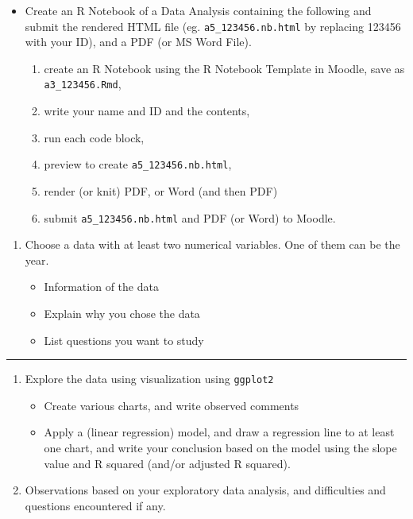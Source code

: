 \documentclass[
]{article}
\providecommand{\tightlist}{%
  \setlength{\itemsep}{0pt}\setlength{\parskip}{0pt}}
\begin{document}
\begin{itemize}
\tightlist
\item
  Create an R Notebook of a Data Analysis containing the following and
  submit the rendered HTML file (eg. \texttt{a5\_123456.nb.html} by
  replacing 123456 with your ID), and a PDF (or MS Word File).

  \begin{enumerate}
  \def\labelenumi{\arabic{enumi}.}
  \tightlist
  \item
    create an R Notebook using the R Notebook Template in Moodle, save
    as \texttt{a3\_123456.Rmd},
  \item
    write your name and ID and the contents,
  \item
    run each code block,
  \item
    preview to create \texttt{a5\_123456.nb.html},
  \item
    render (or knit) PDF, or Word (and then PDF)
  \item
    submit \texttt{a5\_123456.nb.html} and PDF (or Word) to Moodle.
  \end{enumerate}
\end{itemize}

\begin{enumerate}
\def\labelenumi{\arabic{enumi}.}
\item
  Choose a data with at least two numerical variables. One of them can
  be the year.

  \begin{itemize}
  \tightlist
  \item
    Information of the data
  \item
    Explain why you chose the data
  \item
    List questions you want to study
  \end{itemize}
\end{enumerate}

\begin{center}\rule{0.5\linewidth}{0.5pt}\end{center}

\begin{enumerate}
\def\labelenumi{\arabic{enumi}.}
\setcounter{enumi}{1}
\item
  Explore the data using visualization using \texttt{ggplot2}

  \begin{itemize}
  \tightlist
  \item
    Create various charts, and write observed comments
  \item
    Apply a (linear regression) model, and draw a regression line to at
    least one chart, and write your conclusion based on the model using
    the slope value and R squared (and/or adjusted R squared).
  \end{itemize}
\item
  Observations based on your exploratory data analysis, and difficulties
  and questions encountered if any.
\end{enumerate}
\end{document}
